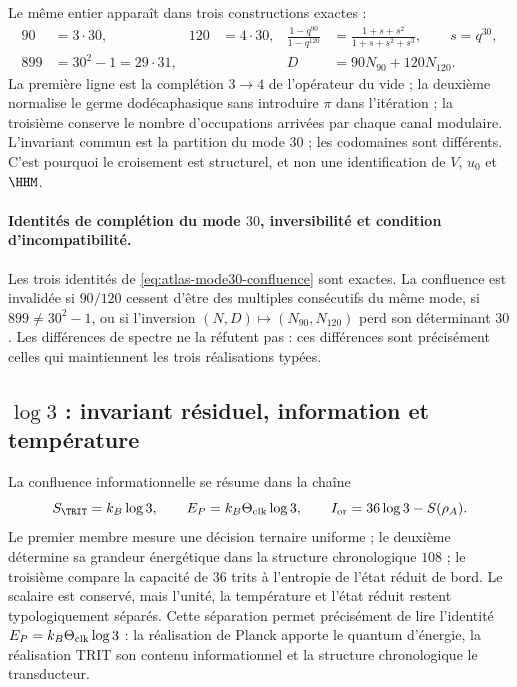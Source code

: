 Le même entier apparaît dans trois constructions exactes :
\begin{equation}
\begin{aligned}
90&=3\cdot30, &120&=4\cdot30,
&\frac{1-q^{90}}{1-q^{120}}
 &=\frac{1+s+s^2}{1+s+s^2+s^3},\qquad s=q^{30},\\
899&=30^2-1=29\cdot31,
&&&D&=90N_{90}+120N_{120}.
\end{aligned}
\label{eq:atlas-mode30-confluence}
\end{equation}
La première ligne est la complétion \(3\to4\) de l'opérateur du vide ; la
deuxième normalise le germe dodécaphasique sans introduire \(\pi\) dans
l'itération ; la troisième conserve le nombre d'occupations arrivées par chaque canal
modulaire. L'invariant commun est la partition du mode \(30\) ; les
codomaines sont différents. C'est pourquoi le croisement est structurel, et non une
identification de \(V\), \(u_0\) et \(\HHM\).

\paragraph{Identités de complétion du mode \(30\), inversibilité et condition d'incompatibilité.}
Les trois identités de \cref{eq:atlas-mode30-confluence} sont exactes. La
confluence est invalidée si \(90/120\) cessent d'être des multiples consécutifs du
même mode, si \(899\ne30^2-1\), ou si l'inversion
\((N,D)\mapsto(N_{90},N_{120})\) perd son déterminant \(30\). Les différences
de spectre ne la réfutent pas : ces différences sont précisément celles qui
maintiennent les trois réalisations typées.

\subsection{\(\log3\) : invariant résiduel, information et température}

La confluence informationnelle se résume dans la chaîne
\begin{equation}
S_{\TRIT}=k_B\log3,\qquad
E_P=k_B\Theta_{\rm clk}\log3,\qquad
I_{\rm or}=36\log3-S(\rho_A).
\label{eq:atlas-log3-confluence}
\end{equation}
Le premier membre mesure une décision ternaire uniforme ; le deuxième détermine
sa grandeur énergétique dans la structure chronologique \(108\) ; le troisième compare la
capacité de \(36\) trits à l'entropie de l'état réduit de bord.
Le scalaire est conservé,
mais l'unité, la température et l'état réduit restent typologiquement
séparés. Cette
séparation permet précisément de lire l'identité
\(E_P=k_B\Theta_{\rm clk}\log3\) : la réalisation de Planck apporte le quantum
d'énergie, la réalisation TRIT son contenu informationnel et la structure
chronologique le transducteur.


